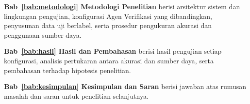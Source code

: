 \textbf{Bab~\ref{bab:metodologi} Metodologi Penelitian} berisi arsitektur sistem
dan lingkungan pengujian, konfigurasi Agen Verifikasi yang dibandingkan,
penyusunan data uji berlabel, serta prosedur pengukuran akurasi dan penggunaan
sumber daya.

\textbf{Bab~\ref{bab:hasil} Hasil dan Pembahasan} berisi hasil pengujian setiap
konfigurasi, analisis pertukaran antara akurasi dan sumber daya, serta pembahasan
terhadap hipotesis penelitian.

\textbf{Bab~\ref{bab:kesimpulan} Kesimpulan dan Saran} berisi jawaban atas
rumusan masalah dan saran untuk penelitian selanjutnya.
